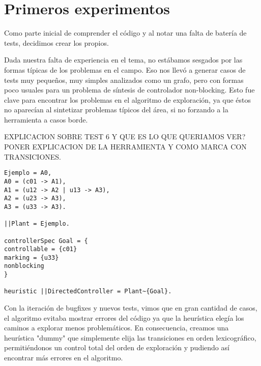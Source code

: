 \section{Primeros experimentos}


Como parte inicial de comprender el código y al notar una falta de batería de tests, decidimos crear los propios. 


Dada nuestra falta de experiencia en el tema, no estábamos sesgados por las formas típicas de los problemas en el campo. Eso nos llevó a generar casos de tests muy pequeños, muy simples analizados como un grafo, pero con formas poco usuales para un problema de síntesis de controlador non-blocking. Esto fue clave para encontrar los problemas en el algoritmo de exploración, ya que éstos no aparecían al sintetizar problemas típicos del área, si no forzando a la herramienta a casos borde.  

EXPLICACION SOBRE TEST 6 Y QUE ES LO QUE QUERIAMOS VER? PONER EXPLICACION DE LA HERRAMIENTA Y COMO MARCA CON TRANSICIONES.

\begin{lstlisting}[language = mtsa, caption=Test 1]
Ejemplo = A0,
A0 = (c01 -> A1),
A1 = (u12 -> A2 | u13 -> A3),
A2 = (u23 -> A3),
A3 = (u33 -> A3).

||Plant = Ejemplo.

controllerSpec Goal = {
controllable = {c01}
marking = {u33}
nonblocking
}

heuristic ||DirectedController = Plant~{Goal}.

\end{lstlisting}

Con la iteración de bugfixes y nuevos tests, vimos que en gran cantidad de casos, el algoritmo evitaba mostrar errores del código ya que la heurística elegía los caminos a explorar menos problemáticos. En consecuencia, creamos una heurística "dummy" que simplemente elija las transiciones en orden lexicográfico, permitiéndonos un control total del orden de exploración y pudiendo así encontrar más errores en el algoritmo.

